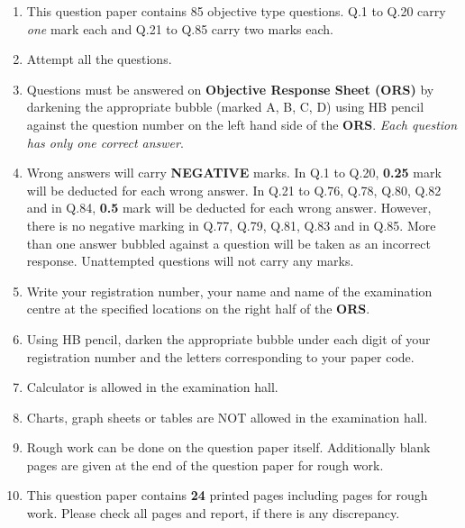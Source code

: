 \documentclass{article}
\begin{document}
		\begin{enumerate}[leftmargin=1.5em, label=\arabic*.]
		    \item This question paper contains 85 objective type questions. Q.1 to Q.20 carry \textit{one} mark each and Q.21 to Q.85 carry two marks each.

		        \item Attempt all the questions.

			    \item Questions must be answered on \textbf{Objective Response Sheet (ORS)} by darkening the appropriate bubble (marked A, B, C, D) using HB pencil against the question number on the left hand side of the \textbf{ORS}. \textit{Each question has only one correct answer}.

			        \item Wrong answers will carry \textbf{NEGATIVE} marks. In Q.1 to Q.20, \textbf{0.25} mark will be deducted for each wrong answer. In Q.21 to Q.76, Q.78, Q.80, Q.82 and in Q.84, \textbf{0.5} mark will be deducted for each wrong answer. However, there is no negative marking in Q.77, Q.79, Q.81, Q.83 and in Q.85. More than one answer bubbled against a question will be taken as an incorrect response. Unattempted questions will not carry any marks.

				    \item Write your registration number, your name and name of the examination centre at the specified locations on the right half of the \textbf{ORS}.

				        \item Using HB pencil, darken the appropriate bubble under each digit of your registration number and the letters corresponding to your paper code.

					    \item Calculator is allowed in the examination hall.

					        \item Charts, graph sheets or tables are NOT allowed in the examination hall.

						    \item Rough work can be done on the question paper itself. Additionally blank pages are given at the end of the question paper for rough work.

						        \item This question paper contains \textbf{24} printed pages including pages for rough work. Please check all pages and report, if there is any discrepancy.
							\end{enumerate}
\end{document}

